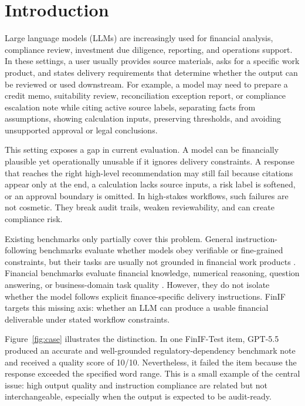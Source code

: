 \section{Introduction}

Large language models (LLMs) are increasingly used for financial analysis, compliance review, investment due diligence, reporting, and operations support.
In these settings, a user usually provides source materials, asks for a specific work product, and states delivery requirements that determine whether the output can be reviewed or used downstream.
For example, a model may need to prepare a credit memo, suitability review, reconciliation exception report, or compliance escalation note while citing active source labels, separating facts from assumptions, showing calculation inputs, preserving thresholds, and avoiding unsupported approval or legal conclusions.

This setting exposes a gap in current evaluation.
A model can be financially plausible yet operationally unusable if it ignores delivery constraints.
A response that reaches the right high-level recommendation may still fail because citations appear only at the end, a calculation lacks source inputs, a risk label is softened, or an approval boundary is omitted.
In high-stakes workflows, such failures are not cosmetic.
They break audit trails, weaken reviewability, and can create compliance risk.

Existing benchmarks only partially cover this problem.
General instruction-following benchmarks evaluate whether models obey verifiable or fine-grained constraints, but their tasks are usually not grounded in financial work products \citep{zhou2023ifeval,jiang2024followbench,qin2024infobench}.
Financial benchmarks evaluate financial knowledge, numerical reasoning, question answering, or business-domain task quality \citep{islam2023financebench,shah2022flue,guo2025fineval,nie2025cfinbench,xie2024finben,lu2025bizfinbench}.
However, they do not isolate whether the model follows explicit finance-specific delivery instructions.
FinIF targets this missing axis: whether an LLM can produce a usable financial deliverable under stated workflow constraints.

Figure~\ref{fig:case} illustrates the distinction.
In one FinIF-Test item, GPT-5.5 produced an accurate and well-grounded regulatory-dependency benchmark note and received a quality score of 10/10.
Nevertheless, it failed the item because the response exceeded the specified word range.
This is a small example of the central issue: high output quality and instruction compliance are related but not interchangeable, especially when the output is expected to be audit-ready.

